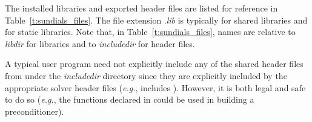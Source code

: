 The installed libraries and exported header files are listed for
reference in Table~\ref{t:sundials_files}.  The file extension .{\em lib}
is typically  for shared libraries and  for static libraries.
Note that, in Table~\ref{t:sundials_files}, names are relative to {\em libdir}
for libraries and to {\em includedir} for header files.

A typical user program need not explicitly include any of the shared
{\sundials} header files from under the {\em includedir}
directory since they are explicitly included by the appropriate solver
header files ({\em e.g.},  includes
). However, it is both legal and safe to do so
({\em e.g.}, the functions declared in  
could be used in building a preconditioner).


